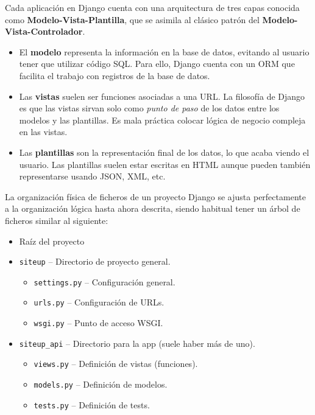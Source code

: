 Cada aplicación en Django cuenta con una arquitectura de tres capas conocida
como \textbf{Modelo-Vista-Plantilla}, que se asimila al clásico patrón del
\textbf{Modelo-Vista-Controlador}.

\begin{itemize}
\item El \textbf{modelo} representa la información en la base de datos, evitando
  al usuario tener que utilizar código SQL. Para ello, Django cuenta con un
  \ac{ORM} que facilita el trabajo con registros de la base de datos.
\item Las \textbf{vistas} suelen ser funciones asociadas a una URL. La filosofía
  de Django es que las vistas sirvan solo como \textit{punto de paso} de los
  datos entre los modelos y las plantillas. Es mala práctica colocar lógica de
  negocio compleja en las vistas.
\item Las \textbf{plantillas} son la representación final de los datos, lo que
  acaba viendo el usuario. Las plantillas suelen estar escritas en HTML aunque
  pueden también representarse usando JSON, XML, etc.
\end{itemize}

La organización física de ficheros de un proyecto Django se ajusta perfectamente
a la organización lógica hasta ahora descrita, siendo habitual tener un árbol de
ficheros similar al siguiente:

\begin{itemize}
\item Raíz del proyecto
\item \texttt{siteup} --  Directorio de proyecto general.
  \begin{itemize}
  \item \texttt{settings.py} -- Configuración general.
  \item \texttt{urls.py} -- Configuración de URLs.
  \item \texttt{wsgi.py} -- Punto de acceso WSGI.
  \end{itemize}
\item \texttt{siteup\_api} --  Directorio para la app (suele haber más de uno).
  \begin{itemize}
  \item \texttt{views.py} -- Definición de vistas (funciones).
  \item \texttt{models.py} -- Definición de modelos.
  \item \texttt{tests.py} -- Definición de tests.
  \end{itemize}
\end{itemize}

